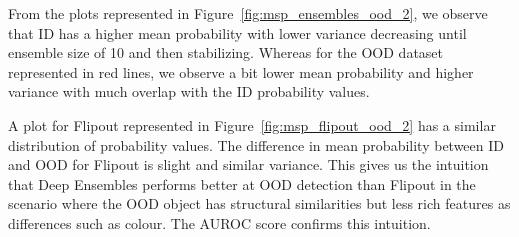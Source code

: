     From the plots represented in Figure~\ref{fig:msp_ensembles_ood_2}, we observe that ID has a higher mean probability with lower variance decreasing until ensemble size of 10 and then stabilizing.
    Whereas for the OOD dataset represented in red lines, we observe a bit lower mean probability and higher variance with much overlap with the ID probability values.
    
    A plot for Flipout represented in Figure~\ref{fig:msp_flipout_ood_2} has a similar distribution of probability values.
    The difference in mean probability between ID and OOD for Flipout is slight and similar variance.
    This gives us the intuition that Deep Ensembles performs better at OOD detection than Flipout in the scenario where the OOD object has structural similarities but less rich features as differences such as colour. The AUROC score confirms this intuition.
    
